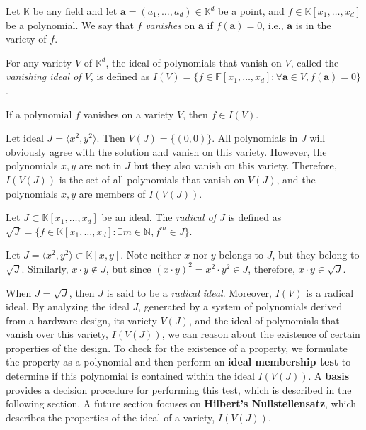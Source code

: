 
Let $\mathbb{K}$ be any field and let $\mathbf{a}=(a_{1},\dots,a_{d}) \in \mathbb{K}^d$ be a point, and $f \in
\mathbb{K}[x_1,\dots, x_d]$ be a polynomial. We say that $f$ {\it vanishes} on $\mathbf{a}$ if $f(\mathbf{a}) = 0$, i.e.,
$\mathbf{a}$ is in the variety of $f$.

\begin{Definition}
For any variety $V$ of $\mathbb{K}^d$, the ideal of polynomials that vanish on $V$,
called the {\it vanishing ideal of $V$}, is defined as $I(V) = \{f\in
\mathbb{F}[x_1,\dots, x_d]: \forall \mathbf{a} \in V, f(\mathbf{a}) =
0\}$. 
\end{Definition}

\begin{Proposition}\label{pro:iofv}
	If a polynomial $f$ vanishes on a variety $V$, then $f \in I(V)$. 
\end{Proposition}

\begin{Example}
	Let ideal $J=\langle x^{2},y^{2}\rangle$. Then $V(J)=\{(0,0)\}$.
	All polynomials in $J$ will obviously agree with the solution and vanish on this variety.
	However, the polynomials $x,y$ are not in $J$ but they also vanish on this variety. 
	Therefore, $I(V(J))$ is the set of all polynomials that vanish on $V(J)$, and the polynomials
	$x,y$ are members of $I(V(J))$.
\end{Example}

\begin{Definition}\label{def:radical}
Let $J \subset \mathbb{K}[x_1,\dots, x_d]$ be an ideal. The {\it radical of $J$} is defined as $\sqrt{J} = \{f \in
\mathbb{K}[x_1,\dots, x_d]: \exists m \in \mathbb{N}, f^m \in J\}$. 
\end{Definition}

\begin{Example}
Let $J=\langle x^2,y^2\rangle \subset \mathbb{K}\left[x,y\right]$.
Note neither $x$ nor $y$ belongs to $J$, but they belong to $\sqrt J$.
Similarly, $x\cdot y \notin J$, but since $(x \cdot y)^{2}=x^{2}\cdot y^{2}\in J$, therefore,
$x\cdot y \in \sqrt J$. 
\end{Example} 

When $J = \sqrt J$, then $J$ is said to be a 
{\it radical ideal}. Moreover, $I(V)$ is a radical ideal.
By analyzing the ideal $J$, generated by a system of polynomials derived 
from a hardware design, its variety $V(J)$, and the ideal of 
polynomials that vanish over this variety, $I(V(J))$, we can reason about the 
existence of certain properties of the design. To check for the existence of 
a property, we formulate the 
property as a polynomial and then perform an {\bf ideal membership test} to 
determine if this polynomial is contained within the ideal $I(V(J))$. 
A {\bf \Grobner basis} provides a decision procedure for performing this 
test, which is described in the following section. 
A future section focuses on {\bf Hilbert's Nullstellensatz}, 
which describes the properties of the ideal of a variety, $I(V(J))$. 

